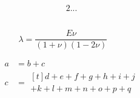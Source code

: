 \documentclass{article}
\begin{document}
\begin{alignat}{2}
  ...
\end{alignat}

\begin{equation}\label{eq:elas:C}
\end{equation}

\begin{equation}\label{eq:elas:lam-mu}
  \lambda = \frac{E \nu}{ (1+\nu)(1-2\nu)} \qquad
\end{equation}


\begin{align}
  a & = b + c \\
  c & =
      \begin{multlined}[t]
        d + e + f + g + h + i + j \\
        + k + l + m + n + o + p + q
      \end{multlined}
\end{align}
\end{document}
